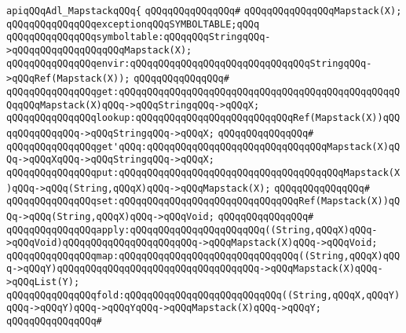 \newline
\newline
\newline
\verb|apiqQQqAdl_MapstackqQQq{|\newline
\verb|qQQqqQQqqQQqqQQq#|\newline
\verb|qQQqqQQqqQQqqQQqMapstack(X);|\newline
\newline
\verb|qQQqqQQqqQQqqQQqexceptionqQQqSYMBOLTABLE;qQQq|\newline
\newline
\verb|qQQqqQQqqQQqqQQqsymboltable:qQQqqQQqStringqQQq->qQQqqQQqqQQqqQQqqQQqMapstack(X);|\newline
\verb|qQQqqQQqqQQqqQQqenvir:qQQqqQQqqQQqqQQqqQQqqQQqqQQqqQQqStringqQQq->qQQqRef(Mapstack(X));|\newline
\verb|qQQqqQQqqQQqqQQq#|\newline
\verb|qQQqqQQqqQQqqQQqget:qQQqqQQqqQQqqQQqqQQqqQQqqQQqqQQqqQQqqQQqqQQqqQQqqQQqqQQqMapstack(X)qQQq->qQQqStringqQQq->qQQqX;|\newline
\verb|qQQqqQQqqQQqqQQqlookup:qQQqqQQqqQQqqQQqqQQqqQQqqQQqRef(Mapstack(X))qQQqqQQqqQQqqQQq->qQQqStringqQQq->qQQqX;|\newline
\verb|qQQqqQQqqQQqqQQq#|\newline
\verb|qQQqqQQqqQQqqQQqget'qQQq:qQQqqQQqqQQqqQQqqQQqqQQqqQQqqQQqMapstack(X)qQQq->qQQqXqQQq->qQQqStringqQQq->qQQqX;|\newline
\verb|qQQqqQQqqQQqqQQqput:qQQqqQQqqQQqqQQqqQQqqQQqqQQqqQQqqQQqqQQqMapstack(X)qQQq->qQQq(String,qQQqX)qQQq->qQQqMapstack(X);|\newline
\verb|qQQqqQQqqQQqqQQq#|\newline
\verb|qQQqqQQqqQQqqQQqset:qQQqqQQqqQQqqQQqqQQqqQQqqQQqqQQqRef(Mapstack(X))qQQq->qQQq(String,qQQqX)qQQq->qQQqVoid;|\newline
\verb|qQQqqQQqqQQqqQQq#|\newline
\verb|qQQqqQQqqQQqqQQqapply:qQQqqQQqqQQqqQQqqQQqqQQq((String,qQQqX)qQQq->qQQqVoid)qQQqqQQqqQQqqQQqqQQqqQQq->qQQqMapstack(X)qQQq->qQQqVoid;|\newline
\verb|qQQqqQQqqQQqqQQqmap:qQQqqQQqqQQqqQQqqQQqqQQqqQQqqQQq((String,qQQqX)qQQq->qQQqY)qQQqqQQqqQQqqQQqqQQqqQQqqQQqqQQqqQQq->qQQqMapstack(X)qQQq->qQQqList(Y);|\newline
\verb|qQQqqQQqqQQqqQQqfold:qQQqqQQqqQQqqQQqqQQqqQQqqQQq((String,qQQqX,qQQqY)qQQq->qQQqY)qQQq->qQQqYqQQq->qQQqMapstack(X)qQQq->qQQqY;|\newline
\verb|qQQqqQQqqQQqqQQq#|\newline
